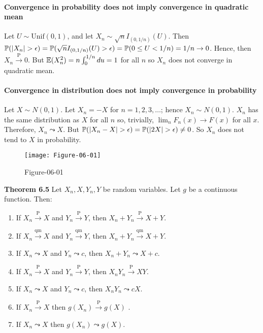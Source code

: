 \paragraph{Convergence in probability does not imply convergence in
quadratic
mean}\label{convergence-in-probability-does-not-imply-convergence-in-quadratic-mean}
Let \(U \sim \text{Unif}(0, 1)\), and let
\(X_{n} \sim \sqrt{n} I_{(0, 1 / n)}(U)\). Then
\(\operatorname{\mathbb{P}}(|X_{n}| > \epsilon) = \operatorname{\mathbb{P}}(\sqrt{n} I_{(0, 1 / n)}(U) > \epsilon) = \operatorname{\mathbb{P}}(0 \leq U < 1/n) = 1/n \rightarrow 0\).
Hence, then \(X_{n} \xrightarrow{\textrm{P}} 0\). But
\(\operatorname{\mathbb{E}}(X_{n}^{2}) = n \int_{0}^{1/n} du = 1\) for all \(n\) so \(X_{n}\)
does not converge in quadratic mean.
\paragraph{Convergence in distribution does not imply convergence in
probability}\label{convergence-in-distribution-does-not-imply-convergence-in-probability}
Let \(X \sim N(0, 1)\). Let \(X_{n} = -X\) for \(n = 1, 2, 3, \dots\);
hence \(X_{n} \sim N(0, 1)\). \(X_{n}\) has the same distribution as \(X\)
for all \(n\) so, trivially, \(\lim _{n} F_{n}(x) \rightarrow F(x)\) for all
\(x\). Therefore, \(X_{n} \leadsto X\). But
\(\operatorname{\mathbb{P}}(|X_{n} - X| > \epsilon) = \operatorname{\mathbb{P}}(|2X| > \epsilon) \neq 0\).
So \(X_{n}\) does not tend to \(X\) in probability.
\begin{figure}[H]
\centering
\texttt{[image: Figure-06-01]}
\caption{Figure-06-01}
\end{figure}


\textbf{Theorem 6.5} Let \(X_{n}, X, Y_{n}, Y\) be random variables. Let
\(g\) be a continuous function. Then:
\begin{enumerate}[tightlist,label={\arabic*.}]
\item
  If \(X_{n} \xrightarrow{\textrm{P}} X\) and
  \(Y_{n} \xrightarrow{\textrm{P}} Y\), then
  \(X_{n} + Y_{n} \xrightarrow{\textrm{P}} X + Y\).
\item
  If \(X_{n} \xrightarrow{\text{qm}} X\) and
  \(Y_{n} \xrightarrow{\text{qm}} Y\), then
  \(X_{n} + Y_{n} \xrightarrow{\text{qm}} X + Y\).
\item
  If \(X_{n} \leadsto X\) and \(Y_{n} \leadsto c\), then
  \(X_{n} + Y_{n} \leadsto X + c\).
\item
  If \(X_{n} \xrightarrow{\textrm{P}} X\) and
  \(Y_{n} \xrightarrow{\textrm{P}} Y\), then
  \(X_{n} Y_{n} \xrightarrow{\textrm{P}} XY\).
\item
  If \(X_{n} \leadsto X\) and \(Y_{n} \leadsto c\), then
  \(X_{n} Y_{n} \leadsto cX\).
\item
  If \(X_{n} \xrightarrow{\textrm{P}} X\) then
  \(g(X_{n}) \xrightarrow{\textrm{P}} g(X)\) .
\item
  If \(X_{n} \leadsto X\) then \(g(X_{n}) \leadsto g(X)\).
\end{enumerate}

